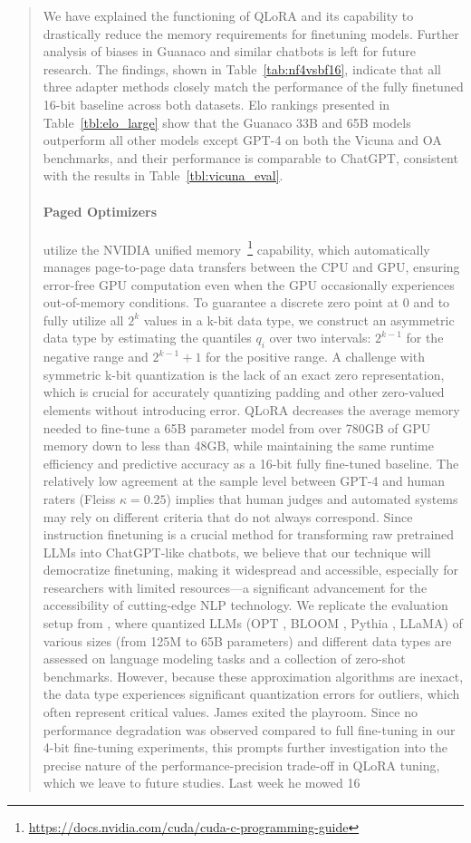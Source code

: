 \begin{quote}
{{We have explained the functioning of QLoRA and its capability to drastically reduce the memory requirements for finetuning models. Further analysis of biases in {Guanaco} and similar chatbots is left for future research. The findings, shown in Table~\ref{tab:nf4vsbf16}, indicate that all three adapter methods closely match the performance of the fully finetuned 16-bit baseline across both datasets. Elo rankings presented in Table~\ref{tbl:elo_large} show that the {Guanaco} 33B and 65B models outperform all other models except GPT-4 on both the Vicuna and OA benchmarks, and their performance is comparable to ChatGPT, consistent with the results in Table~\ref{tbl:vicuna_eval}. \paragraph{Paged Optimizers} utilize the NVIDIA unified memory~\footnote{\tiny \url{https://docs.nvidia.com/cuda/cuda-c-programming-guide}} capability, which automatically manages page-to-page data transfers between the CPU and GPU, ensuring error-free GPU computation even when the GPU occasionally experiences out-of-memory conditions. To guarantee a discrete zero point at $0$ and to fully utilize all $2^k$ values in a k-bit data type, we construct an asymmetric data type by estimating the quantiles $q_i$ over two intervals: $2^{k-1}$ for the negative range and $2^{k-1}+1$ for the positive range. A challenge with symmetric k-bit quantization is the lack of an exact zero representation, which is crucial for accurately quantizing padding and other zero-valued elements without introducing error. \textsc{QLoRA} decreases the average memory needed to fine-tune a 65B parameter model from over 780GB of GPU memory down to less than 48GB, while maintaining the same runtime efficiency and predictive accuracy as a 16-bit fully fine-tuned baseline. The relatively low agreement at the sample level between GPT-4 and human raters (Fleiss $\kappa=0.25$) implies that human judges and automated systems may rely on different criteria that do not always correspond. Since instruction finetuning is a crucial method for transforming raw pretrained LLMs into ChatGPT-like chatbots, we believe that our technique will democratize finetuning, making it widespread and accessible, especially for researchers with limited resources—a significant advancement for the accessibility of cutting-edge NLP technology. We replicate the evaluation setup from \citet{dettmers2022case}, where quantized LLMs (OPT \citep{zhang2022opt}, BLOOM \cite{scao2022bloom}, Pythia \cite{biderman2023pythia}, LLaMA) of various sizes (from 125M to 65B parameters) and different data types are assessed on language modeling tasks and a collection of zero-shot benchmarks. However, because these approximation algorithms are inexact, the data type experiences significant quantization errors for outliers, which often represent critical values. James exited the playroom. Since no performance degradation was observed compared to full fine-tuning in our 4-bit fine-tuning experiments, this prompts further investigation into the precise nature of the performance-precision trade-off in QLoRA tuning, which we leave to future studies. Last week he mowed 16 }}
\end{quote}

